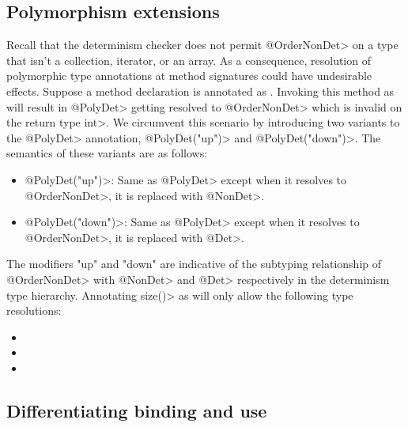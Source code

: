 \subsection{Polymorphism extensions}\label{polymorphism-extensions}

Recall that the determinism checker does not permit \<@OrderNonDet> on a type that isn't a collection, iterator, or an array.
As a consequence, resolution of polymorphic type annotations at method signatures could have undesirable effects.
Suppose a method declaration is annotated as . Invoking this method
as  will result in \<@PolyDet> getting resolved to \<@OrderNonDet> which is invalid
on the return type \<int>. We circumvent this scenario by introducing two variants to the \<@PolyDet> annotation, \<@PolyDet("up")>
and \<@PolyDet("down")>. The semantics of these variants are as follows:
\begin{itemize}
    \item \<@PolyDet("up")>: Same as \<@PolyDet> except when it resolves to \<@OrderNonDet>, it is replaced with \<@NonDet>.
    \item \<@PolyDet("down")>: Same as \<@PolyDet> except when it resolves to \<@OrderNonDet>, it is replaced with \<@Det>.
\end{itemize} 
The modifiers "up" and "down" are indicative of the subtyping relationship of \<@OrderNonDet> with \<@NonDet> and \<@Det> respectively
in the determinism type hierarchy.
Annotating \<size()> as  will only allow the following type resolutions:
\begin{itemize}
    \item {}
    \item {}
    \item {}
\end{itemize}

\subsection{Differentiating binding and use}\label{bindings-uses}

